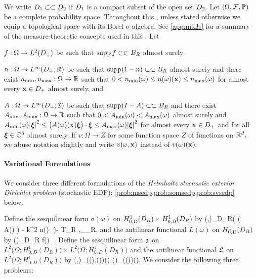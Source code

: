 We write $D_{1} \subset\subset D_{2}$ if $D_{1}$ is a compact subset of the open set $D_{2}.$ Let $\OFP$ be a complete probability space. Throughout this , unless stated otherwise we equip a topological space with its Borel $\sigma$-algebra. See \cref{app:mtBs} for a summary of the measure-theoretic concepts used in this . Let
\bit
\item $f:\Omega\rightarrow\LtDp$ be such that $\operatorname{supp} f \subset\subset B_{R}$ almost surely
\item $n:\Omega\rightarrow \LiDpRR$ be such that $\operatorname{supp}(1-n) \subset\subset B_{R}$ almost surely and there exist $n_{\min}, n_{\max}:\Omega\rightarrow \mathbb R$ such that
$0 < n_{\min}(\omega) \leq n(\omega)(\mathbf{x}) \leq n_{\max}(\omega)$
for almost every $\mathbf{x} \in D_{+}$ almost surely, and
\item $A:\Omega\rightarrow\LiDpRRdtd$ be such that $\operatorname{supp}(I-A) \subset\subset B_{R}$ and there exist $A_{\min},A_{\max}:\Omega \rightarrow \mathbb R$ such that $0 < A_{\min}(\omega) < A_{\max}(\omega)$ almost surely and
$\Amin(\omega)\abs{\bxi}^2 \leq \big(A(\omega)(\bx)\bxi\big)\cdot\bxi \leq \Amax(\omega)\abs{\bxi}^2$
for almost every $\mathbf{x} \in D_{+}$ and for all $\boldsymbol{\xi} \in \mathbb C^{d}$ almost surely.
\eit
If $v:\Omega \rightarrow Z$ for some function space $Z$ of functions on $\mathbb R^{d},$ we abuse notation slightly and write $v(\omega,\mathbf{x})$ instead of $v(\omega)(\mathbf{x}).$


%

\paragraph{Variational Formulations} We consider three different formulations of the  \emph{Helmholtz stochastic exterior Dirichlet problem} (stochastic EDP); \cref{prob:msedp,prob:somsedp,prob:svsedp} below.

Define the sesquilinear form $a(\omega)$ on $\HozDDR \times \HozDDR$ by
\beq\label{eq:SEDPa}
\mleft(\vo,\vt\mright)\de\int_{D_R}\Big( \mleft( A(\omega) \grad \vo\mright)\cdot \grad \vtb 
 - k^2 n(\omega)\, \vo\,\vtb \Big)\dd\Leb- \big\langle T_R \gamma \vo,\gamma \vt\big\rangle_{\Gamma_R},
 \eeq
 and the antilinear functional $L(\omega)$ on $\HozDDR$ by
\beq\label{eq:SEDPL}
(\vt)\de \int_{D_R} f(\omega)\, \vtb\,\dd\Leb.
\eeq
Define the sesquilinear form $\mathfrak{a}$ on $L^2\big(\Omega;H_{0,D}^1(D_R)\big)\times L^2\big(\Omega;H_{0,D}^1(D_R)\big)$ and the antilinear functional $\mathfrak{L}$ on $L^2\big(\Omega;H_{0,D}^1(D_R)\big)$ by 
\beq\label{eq:SEDPas}
\as\mleft(\vo,\vt\mright)\de \int_\Omega {}\mleft(\vo(\omega),\vt(\omega)\mright)\dd\PP(\omega)
\quad{} \quad
%
\Ls(\vt)\de \int_\Omega {}\mleft(\vt(\omega)\mright)\dd\PP(\omega).
\eeq
We consider the following three problems:

